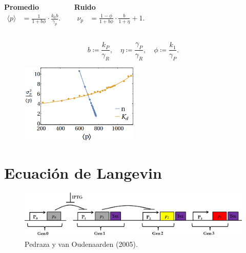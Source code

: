 \documentclass[xcolor=dvipsnames]{beamer}
\begin{document}
\begin{frame}
\begin{columns}[c]

\vspace{3mm}


\centering \textbf{Promedio}
\begin{align*}
\langle p \rangle &= \frac{1}{1+b\phi} \cdot \frac{k_0b}{\gamma_p}.
\end{align*}

\centering \textbf{Ruido}
\begin{align*}
\nu_p &= \frac{1-\phi}{1+b\phi} \cdot \frac{b}{1+\eta}+1.
\end{align*}
\end{columns}

\vspace{3 mm}

\begin{equation*}
  b \coloneqq \frac{k_P}{\gamma_R}, \quad \eta \coloneqq \frac{\gamma_P}{\gamma_R}, \quad \phi \coloneqq \frac{k_1}{\gamma_P}.
\end{equation*}

\begin{figure}[p]
    \centering
    \includegraphics[width=0.5\textwidth]{Pmas-autorreg_analytic_solver}
\end{figure}

\end{frame}

\section{Ecuaci\'on de Langevin}

\begin{frame}
\begin{figure}[p]
    \centering
    \includegraphics[width=\textwidth]{lan-Circuit}\\
    \tiny Pedraza y van Oudenaarden (2005).
\end{figure}
\end{frame}
\end{document}

